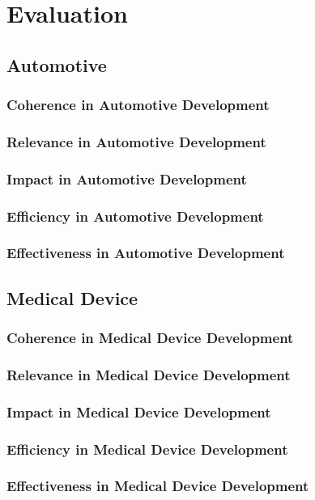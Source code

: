 \chapter{Evaluation}

\section{Automotive}

\subsection{Coherence in Automotive Development}

\subsection{Relevance in Automotive Development}

\subsection{Impact in Automotive Development}

\subsection{Efficiency in Automotive Development}

\subsection{Effectiveness in Automotive Development}

\section{Medical Device}

\subsection{Coherence in Medical Device Development}

\subsection{Relevance in Medical Device Development}

\subsection{Impact in Medical Device Development}

\subsection{Efficiency in Medical Device Development}

\subsection{Effectiveness in Medical Device Development}